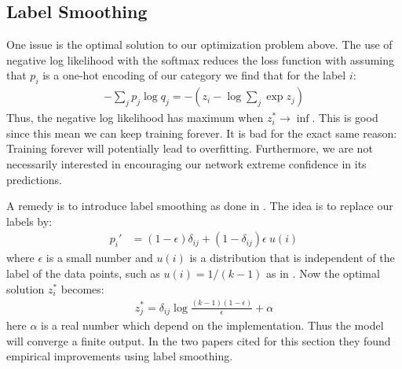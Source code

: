 \subsection{Label Smoothing}
One issue is the optimal solution to our optimization problem above.
The use of negative log likelihood with the softmax reduces the loss function with assuming that $p_i$ is a one-hot encoding of our category we find that for the label $i$:
\begin{align}
	-\sum_{j} p_j \log q_j = - (z_i - \log{\sum_j \exp z_j} )
\end{align}
Thus, the negative log likelihood has maximum when $z_i^{*} \to \inf$. This is good since this mean we can keep training forever. It is bad for the exact same reason: Training forever will potentially lead to overfitting. Furthermore, we are not necessarily interested in encouraging our network extreme confidence in its predictions.\cite{szegedyRethinkingInceptionArchitecture2015}

A remedy is to introduce label smoothing as done in \cite{szegedyRethinkingInceptionArchitecture2015}.
The idea is to replace our labels by:
\begin{align}
	p_i' &= (1-\epsilon) \delta_{ij} + (1-\delta_{ij})\epsilon \: u(i)
\end{align}
where $\epsilon$ is a small number and $u(i)$ is a distribution that is independent of the label of the data points, such as $u(i) = 1/(k-1)$ as in \cite{heBagTricksImage2019a}. Now the optimal solution $z_i^{*}$ becomes:
\begin{align}
	z_j^* = \delta_{ij} \log{\frac{(k-1)(1-\epsilon)}{\epsilon}} + \alpha  
\end{align}
here $\alpha$ is a real number which depend on the implementation. Thus the model will converge a finite output. In the two papers cited for this section they found empirical improvements using label smoothing.

